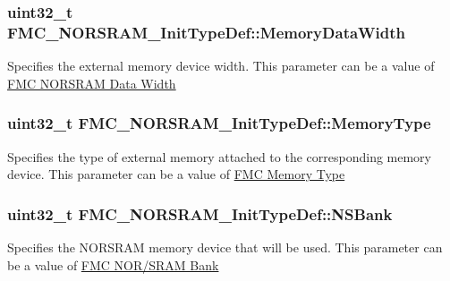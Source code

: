 \subsubsection[{\texorpdfstring{Memory\+Data\+Width}{MemoryDataWidth}}]{\setlength{\rightskip}{0pt plus 5cm}uint32\+\_\+t F\+M\+C\+\_\+\+N\+O\+R\+S\+R\+A\+M\+\_\+\+Init\+Type\+Def\+::\+Memory\+Data\+Width}\hypertarget{struct_f_m_c___n_o_r_s_r_a_m___init_type_def_a2516472b7d961cd65c000f991536bf2d}{}\label{struct_f_m_c___n_o_r_s_r_a_m___init_type_def_a2516472b7d961cd65c000f991536bf2d}
Specifies the external memory device width. This parameter can be a value of \hyperlink{group___f_m_c___n_o_r_s_r_a_m___data___width}{F\+MC N\+O\+R\+S\+R\+AM Data Width} 
\subsubsection[{\texorpdfstring{Memory\+Type}{MemoryType}}]{\setlength{\rightskip}{0pt plus 5cm}uint32\+\_\+t F\+M\+C\+\_\+\+N\+O\+R\+S\+R\+A\+M\+\_\+\+Init\+Type\+Def\+::\+Memory\+Type}\hypertarget{struct_f_m_c___n_o_r_s_r_a_m___init_type_def_a53eb4b6eb5a7fef776280a6f95a52dbf}{}\label{struct_f_m_c___n_o_r_s_r_a_m___init_type_def_a53eb4b6eb5a7fef776280a6f95a52dbf}
Specifies the type of external memory attached to the corresponding memory device. This parameter can be a value of \hyperlink{group___f_m_c___memory___type}{F\+MC Memory Type} 
\subsubsection[{\texorpdfstring{N\+S\+Bank}{NSBank}}]{\setlength{\rightskip}{0pt plus 5cm}uint32\+\_\+t F\+M\+C\+\_\+\+N\+O\+R\+S\+R\+A\+M\+\_\+\+Init\+Type\+Def\+::\+N\+S\+Bank}\hypertarget{struct_f_m_c___n_o_r_s_r_a_m___init_type_def_ad43ca00a46db6527d3ac3fde29ec20cb}{}\label{struct_f_m_c___n_o_r_s_r_a_m___init_type_def_ad43ca00a46db6527d3ac3fde29ec20cb}
Specifies the N\+O\+R\+S\+R\+AM memory device that will be used. This parameter can be a value of \hyperlink{group___f_m_c___n_o_r_s_r_a_m___bank}{F\+MC N\+O\+R/\+S\+R\+AM Bank} 
